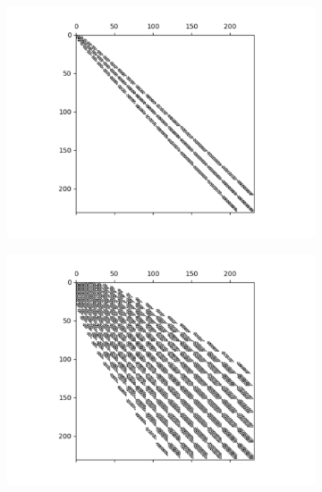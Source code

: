 \documentclass[11pt, oneside]{article}   	%
\begin{document}
\begin{figure}
	\centering
	\begin{subfigure}[t]{0.32\textwidth}
	\centering
	\includegraphics[scale=0.35]{sparsityoflaplacian-w11}
	\end{subfigure}
	\begin{subfigure}[t]{0.32\textwidth}
	\centering
	\includegraphics[scale=0.35]{sparsityofhelmholtz}
	\end{subfigure}
	\begin{subfigure}[t]{0.32\textwidth}
	\centering

\end{subfigure}
\end{figure}
\end{document}
